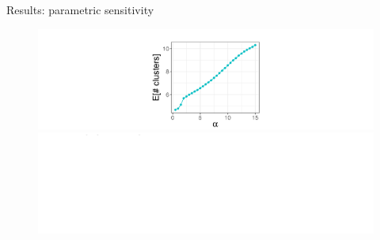 \documentclass[10pt]{beamer}\usepackage[]{graphicx}\usepackage[]{color}
\newenvironment{knitrout}{}{} %
\begin{document}
\begin{frame}{Results: parametric sensitivity}

\begin{figure}
\centering
\begin{knitrout}
\color{fgcolor}

{\centering \includegraphics[width=0.98\linewidth,height=0.294\linewidth]{masked_results_fig/param_sens_plot_thresh_0_masked1-1} 

}



\end{knitrout}
\begin{knitrout}
\color{fgcolor}

{\centering \includegraphics[width=0.98\linewidth,height=0.294\linewidth]{masked_results_fig/param_sens_plot_thresh_0b_masked-1} 

}



\end{knitrout}
\end{figure}

\end{frame}
\end{document}
